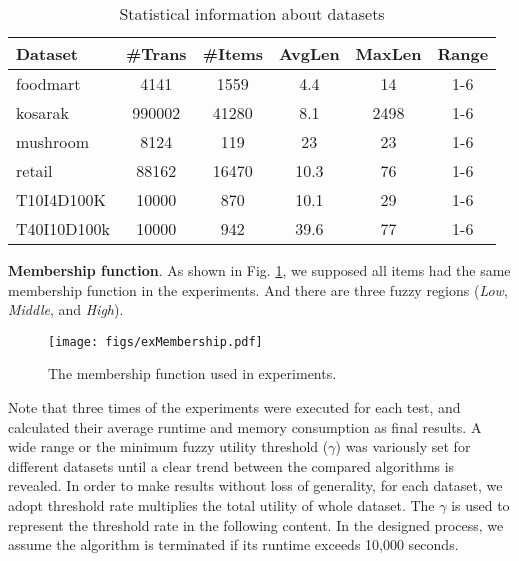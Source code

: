 \documentclass[journal]{IEEEtran}
\begin{document}
\begin{table}[!h]
	\begin{center}
		\caption{Statistical information about datasets}
		\label{tab:experiments}
		\begin{tabular}{lccccc}
			\hline
			\textbf{Dataset} & \#\textbf{Trans} & \#\textbf{Items} & \textbf{AvgLen} & \textbf{MaxLen} & \textbf{Range} \\ \hline 
			foodmart & 4141 & 1559 & 4.4 & 14 & 1-6 \\ 
			kosarak & 990002 & 41280 & 8.1 & 2498 & 1-6 \\ 
			mushroom & 8124 & 119 & 23 & 23 & 1-6 \\ 
			retail & 88162 & 16470 & 10.3 & 76 & 1-6 \\ 
			T10I4D100K & 10000 & 870 & 10.1 & 29 & 1-6 \\ 
			T40I10D100k & 10000 & 942 & 39.6 & 77 & 1-6 \\
			\hline
		\end{tabular}
	\end{center}
\end{table}


\textbf{Membership function}. As shown in Fig. \ref{fig:exMembership}, we supposed all items had the same membership function in the experiments. And there are three fuzzy regions (\textit{Low}, \textit{Middle}, and \textit{High}).


\begin{figure}[hbt]
	\centering
	\texttt{[image: figs/exMembership.pdf]}
	\caption{The membership function used in experiments.}
	\label{fig:exMembership}
\end{figure}


Note that three times of the experiments were executed for each test, and calculated their average runtime and memory consumption as final results. A wide range or the minimum fuzzy utility threshold ($\gamma$) was variously set for different datasets until a clear trend between the compared algorithms is revealed. In order to make results without loss of generality, for each dataset, we adopt threshold rate multiplies the total utility of whole dataset. The $\gamma$ is used to represent the threshold rate in the following content. In the designed process, we assume the algorithm is terminated if its runtime exceeds 10,000 seconds.
\end{document}
